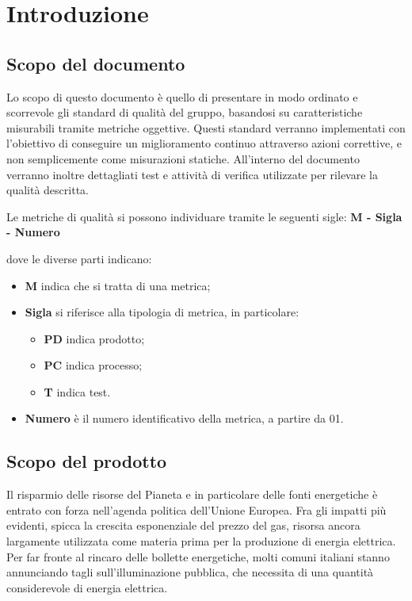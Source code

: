\chapter{Introduzione}
\section{Scopo del documento}
Lo scopo di questo documento è quello di presentare in modo ordinato e scorrevole gli standard di qualità del gruppo, basandosi su caratteristiche misurabili tramite metriche oggettive. Questi standard verranno implementati con l'obiettivo di conseguire un miglioramento continuo attraverso azioni correttive, e non semplicemente come misurazioni statiche. All'interno del documento verranno inoltre dettagliati test e attività di verifica utilizzate per rilevare la qualità descritta.

Le metriche di qualità si possono individuare tramite le seguenti sigle: \textbf{M - Sigla - Numero}

dove le diverse parti indicano:

\begin{itemize}
    \item \textbf{M} indica che si tratta di una metrica;
    \item \textbf{Sigla} si riferisce alla tipologia di metrica, in particolare:
    \begin{itemize}
        \item \textbf{PD} indica prodotto;
        \item \textbf{PC} indica processo;
        \item \textbf{T} indica test.
    \end{itemize}
    \item \textbf{Numero} è il numero identificativo della metrica, a partire da 01.
\end{itemize}

\section{Scopo del prodotto}
Il risparmio delle risorse del Pianeta e in particolare delle fonti energetiche è entrato con forza nell'agenda politica dell’Unione Europea. Fra gli impatti più evidenti, spicca la crescita esponenziale del prezzo del gas, risorsa ancora largamente utilizzata come materia prima per la produzione di energia elettrica.
Per far fronte al rincaro delle bollette energetiche, molti comuni italiani stanno annunciando tagli sull’illuminazione pubblica, che necessita di una quantità considerevole di energia elettrica.

